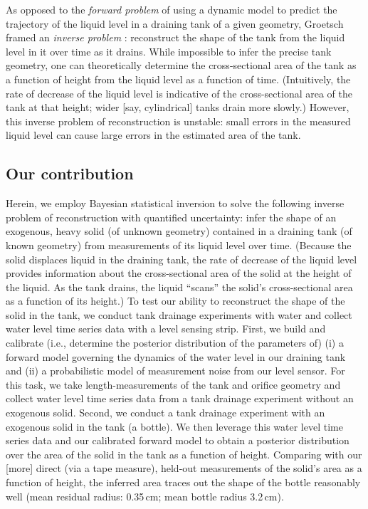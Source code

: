 \documentclass[openacc]{rsproca_new}%
\begin{document}
As opposed to the \emph{forward problem} of using a dynamic model to predict the trajectory of the liquid level in a draining tank of a given geometry, Groetsch \cite{groetsch1993inverse,groetsch1999inverse} framed an \emph{inverse problem} \cite{groetsch1993inverse,neto2012introduction,tarantola2005inverse}: reconstruct the shape of the tank from the liquid level in it over time as it drains. 
While impossible to infer the precise tank geometry, one can theoretically determine the cross-sectional area of the tank as a function of height from the liquid level as a function of time. (Intuitively, the rate of decrease of the liquid level is indicative of the cross-sectional area of the tank at that height; wider [say, cylindrical] tanks drain more slowly.)
However, this inverse problem of reconstruction is unstable: small errors in the measured liquid level can cause large errors in the estimated area of the tank. \cite{groetsch1993inverse}

\subsection{Our contribution}
Herein, we employ Bayesian statistical inversion \cite{calvetti2018inverse,waqar2023tutorial,kaipio2006statistical,dashti2013bayesian} to solve the following inverse problem of reconstruction with quantified uncertainty: infer the shape of an exogenous, heavy solid (of unknown geometry) contained in a draining tank (of known geometry) from measurements of its liquid level over time.
(Because the solid displaces liquid in the draining tank, the rate of decrease of the liquid level provides information about the cross-sectional area of the solid at the height of the liquid.
As the tank drains, the liquid ``scans'' the solid's cross-sectional area as a function of its height.)
To test our ability to reconstruct the shape of the solid in the tank, we conduct tank drainage experiments with water and collect water level time series data with a level sensing strip. First, we build and calibrate (i.e., determine the posterior distribution of the parameters of) (i) a forward model governing the dynamics of the water level in our draining tank and (ii) a probabilistic model of measurement noise from our level sensor.
For this task, we take length-measurements of the tank and orifice geometry and collect water level time series data from a tank drainage experiment without an exogenous solid. 
Second, we conduct a tank drainage experiment with an exogenous solid in the tank (a bottle). We then leverage this water level time series data and our calibrated forward model to obtain a posterior distribution over the area of the solid in the tank as a function of height.
Comparing with our [more] direct (via a tape measure), held-out measurements of the solid's area as a function of height, the inferred area traces out the shape of the bottle reasonably well (mean residual radius: 0.35\,cm; mean bottle radius 3.2\,cm). 
\end{document}
